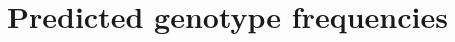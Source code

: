 \documentclass[a4paper,11pt]{article}
\begin{document}





\section{Predicted genotype frequencies}
\label{pred-gen-freq}
\end{document}
